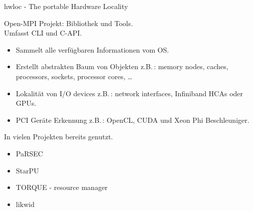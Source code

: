 \begin{frame}{hwloc - The portable Hardware Locality}

    Open-MPI Projekt: Bibliothek und Tools.\\
    Umfasst CLI und C-API.

    \begin{itemize}
    \item Sammelt alle verf\"{u}gbaren Informationen vom OS.
    \item Erstellt abstrakten Baum von Objekten z.B.\,: memory nodes, caches,
        processors, sockets, processor cores, \ldots
    \item Lokalit\"{a}t von I/O devices z.B.\,: network interfaces, Infiniband HCAs
        oder GPUs.
    \item PCI Ger\"{a}te Erkennung z.B.\,: OpenCL, CUDA und Xeon Phi
        Beschleuniger.
    \end{itemize}


    In vielen Projekten bereits genutzt.\\
    \begin{itemize}
        \item PaRSEC
        \item StarPU
        \item TORQUE - resource manager
        \item likwid
    \end{itemize}





\end{frame}


